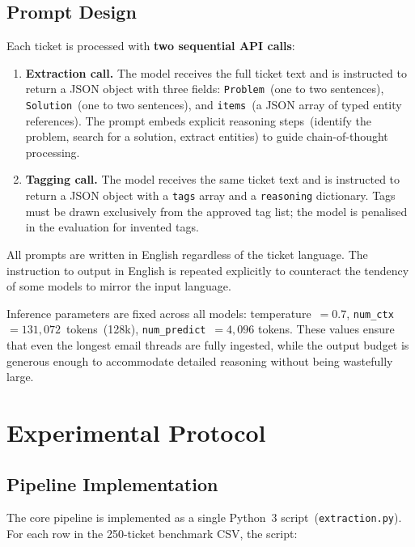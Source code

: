 \subsection{Prompt Design}
\label{sec:prompt-design}
%
Each ticket is processed with \textbf{two sequential API calls}:

\begin{enumerate}
    \item \textbf{Extraction call.}  The model receives the full ticket text
          and is instructed to return a JSON object with three fields:
          \texttt{Problem}~(one to two sentences), \texttt{Solution}~(one to two sentences),
          and \texttt{items}~(a JSON array of typed entity references).
          The prompt embeds explicit reasoning steps~(identify the problem,
          search for a solution, extract entities) to guide chain-of-thought
          processing.

    \item \textbf{Tagging call.}  The model receives the same ticket text and
          is instructed to return a JSON object with a \texttt{tags} array
          and a \texttt{reasoning} dictionary.  Tags must be drawn exclusively
          from the approved tag list; the model is penalised in the evaluation
          for invented tags.
\end{enumerate}

All prompts are written in English regardless of the ticket language.  The
instruction to output in English is repeated explicitly to counteract
the tendency of some models to mirror the input language.

Inference parameters are fixed across all models: temperature~$= 0.7$,
\texttt{num\_ctx}~$= 131{,}072$~tokens~(128k), \texttt{num\_predict}~$= 4{,}096$
tokens.  These values ensure that even the longest email threads are fully
ingested, while the output budget is generous enough to accommodate detailed
reasoning without being wastefully large.

\section{Experimental Protocol}
\label{sec:experimental-protocol}
%
\subsection{Pipeline Implementation}
%
The core pipeline is implemented as a single Python~3 script~(\texttt{extraction.py}).
For each row in the 250-ticket benchmark CSV, the script:

